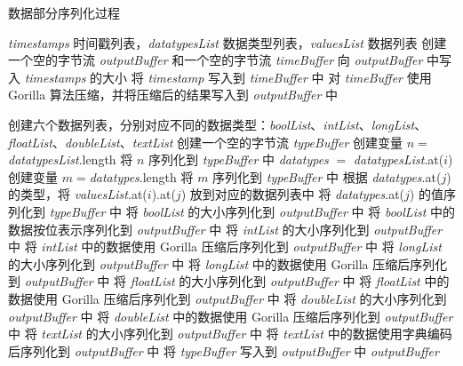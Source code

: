 \begin{algorithm}
  \caption{数据部分序列化过程}
  \label{alg:value-encoding}
  \small
  \begin{algorithmic}
    \REQUIRE \emph{timestamps} 时间戳列表，\emph{datatypesList} 数据类型列表，\emph{valuesList} 数据列表 
    \STATE 创建一个空的字节流 \emph{outputBuffer} 和一个空的字节流 \emph{timeBuffer}
    \STATE 向 \emph{outputBuffer} 中写入 \emph{timestamps} 的大小
      \STATE 将 \emph{timestamp} 写入到 \emph{timeBuffer} 中
    \ENDFOR
    \STATE 对 \emph{timeBuffer} 使用 Gorilla 算法压缩，并将压缩后的结果写入到 \emph{outputBuffer} 中 

    \STATE 创建六个数据列表，分别对应不同的数据类型：\emph{boolList}、\emph{intList}、\emph{longList}、\emph{floatList}、\emph{doubleList}、\emph{textList}
    \STATE 创建一个空的字节流 \emph{typeBuffer}
    \STATE 创建变量 $n = $\emph{datatypesList}.length
    \STATE 将 $n$ 序列化到 \emph{typeBuffer} 中
      \STATE \emph{datatypes} $=$ \emph{datatypesList}.at($i$)
      \STATE 创建变量 $m = $\emph{datatypes}.length
      \STATE 将 $m$ 序列化到 \emph{typeBuffer} 中
        \STATE 根据 \emph{datatypes}.at($j$) 的类型，将 \emph{valuesList}.at($i$).at($j$) 放到对应的数据列表中
        \STATE 将 \emph{datatypes}.at($j$) 的值序列化到 \emph{typeBuffer} 中
      \ENDFOR
    \ENDFOR
    \STATE 将 \emph{boolList} 的大小序列化到 \emph{outputBuffer} 中
    \STATE 将 \emph{boolList} 中的数据按位表示序列化到 \emph{outputBuffer} 中
    \STATE 将 \emph{intList} 的大小序列化到 \emph{outputBuffer} 中
    \STATE 将 \emph{intList} 中的数据使用 Gorilla 压缩后序列化到 \emph{outputBuffer} 中
    \STATE 将 \emph{longList} 的大小序列化到 \emph{outputBuffer} 中
    \STATE 将 \emph{longList} 中的数据使用 Gorilla 压缩后序列化到 \emph{outputBuffer} 中
    \STATE 将 \emph{floatList} 的大小序列化到 \emph{outputBuffer} 中
    \STATE 将 \emph{floatList} 中的数据使用 Gorilla 压缩后序列化到 \emph{outputBuffer} 中
    \STATE 将 \emph{doubleList} 的大小序列化到 \emph{outputBuffer} 中
    \STATE 将 \emph{doubleList} 中的数据使用 Gorilla 压缩后序列化到 \emph{outputBuffer} 中
    \STATE 将 \emph{textList} 的大小序列化到 \emph{outputBuffer} 中
    \STATE 将 \emph{textList} 中的数据使用字典编码后序列化到 \emph{outputBuffer} 中
    \STATE 将 \emph{typeBuffer} 写入到 \emph{outputBuffer} 中
    \RETURN \emph{outputBuffer}

  \end{algorithmic}
\end{algorithm}
